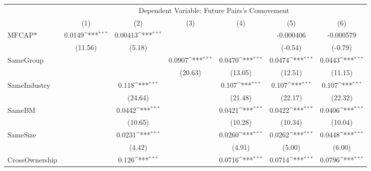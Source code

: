 {
\def\sym#1{\ifmmode^{#1}\else\(^{#1}\)\fi}
\begin{tabular}{l*{6}{c}}
\hline\hline
                    &\multicolumn{6}{c}{Dependent Variable:  Future Pairs's Comovement}                                                                 \\\cmidrule(lr){2-7}
                    &\multicolumn{1}{c}{(1)}         &\multicolumn{1}{c}{(2)}         &\multicolumn{1}{c}{(3)}         &\multicolumn{1}{c}{(4)}         &\multicolumn{1}{c}{(5)}         &\multicolumn{1}{c}{(6)}         \\
\hline
$ \text{MFCAP*} $   &      0.0149\sym{***}&     0.00413\sym{***}&                     &                     &   -0.000406         &   -0.000579         \\
                    &     (11.56)         &      (5.18)         &                     &                     &     (-0.54)         &     (-0.79)         \\
[1em]
SameGroup           &                     &                     &      0.0907\sym{***}&      0.0470\sym{***}&      0.0474\sym{***}&      0.0443\sym{***}\\
                    &                     &                     &     (20.63)         &     (13.05)         &     (12.51)         &     (11.15)         \\
[1em]
SameIndustry        &                     &       0.118\sym{***}&                     &       0.107\sym{***}&       0.107\sym{***}&       0.107\sym{***}\\
                    &                     &     (24.64)         &                     &     (21.48)         &     (22.17)         &     (22.32)         \\
[1em]
SameBM              &                     &      0.0442\sym{***}&                     &      0.0421\sym{***}&      0.0422\sym{***}&      0.0406\sym{***}\\
                    &                     &     (10.65)         &                     &     (10.28)         &     (10.34)         &     (10.04)         \\
[1em]
SameSize            &                     &      0.0231\sym{***}&                     &      0.0260\sym{***}&      0.0262\sym{***}&      0.0448\sym{***}\\
                    &                     &      (4.42)         &                     &      (4.91)         &      (5.00)         &      (6.00)         \\
[1em]
CrossOwnership      &                     &       0.126\sym{***}&                     &      0.0716\sym{***}&      0.0714\sym{***}&      0.0796\sym{***}\\

\end{tabular}}
